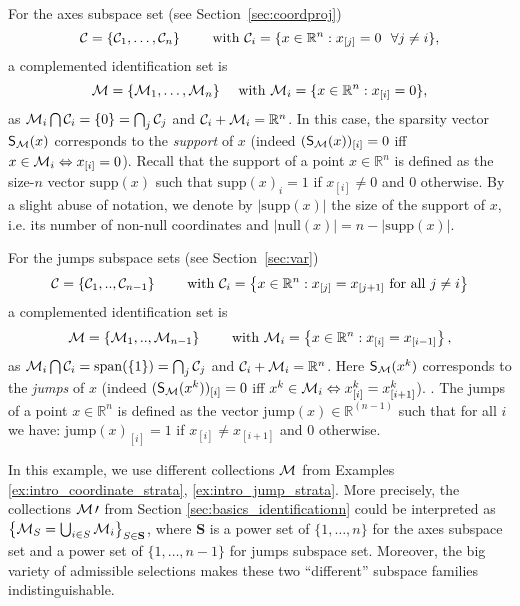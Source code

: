 \begin{example}\label{ex:supp}
For the axes subspace set (see Section~\ref{sec:coordproj})
\begin{equation}\label{eq:Ccoord}
    \mathcal{C} = \{\mathcal{C}_1,\ldots,\mathcal{C}_n\} \qquad\text{ with } \mathcal{C}_i = \{x\in\mathbb{R}^n  : x_{[j]} = 0 ~~ \forall j \neq i \},
\end{equation}
a {complemented} identification set is 
\begin{equation}\label{eq:Mcoord}
    \mathcal{M} = \{\mathcal{M}_1,\ldots,\mathcal{M}_n\} \quad\text{ with } \mathcal{M}_i = \{x\in\mathbb{R}^n  : x_{[i]} = 0 \}, 
\end{equation} 
as $\mathcal{M}_i \bigcap \mathcal{C}_i = \{0\} = \bigcap_j \mathcal{C}_j$ and $\mathcal{C}_i+\mathcal{M}_i = \mathbb{R}^n$. 
{In this case, the sparsity vector $\mathsf{S}_{\mathcal{M}}(x)$ corresponds to the \emph{support} of $x$ (indeed $(\mathsf{S}_{\mathcal{M}}(x))_{[i]} = 0$ iff $x \in \mathcal{M}_i \Leftrightarrow x_{[i]}=0$). Recall that the support of a point $x\in\mathbb{R}^n$ is defined as the size-$n$ vector $\mathrm{supp}(x)$ such that $\mathrm{supp}(x)_i = 1$ if $x_{[i]}\neq 0$ and $0$ otherwise. By a slight abuse of notation, we denote by $|\mathrm{supp}(x)|$ the size of the support of $x$, i.e. its number of non-null coordinates and $|\mathrm{null}(x)| = n - |\mathrm{supp}(x)|$.}

For the jumps subspace sets (see Section~\ref{sec:var})
\begin{equation}\label{eq:Cjump}
    \mathcal{C} = \{\mathcal{C}_1,..,\mathcal{C}_{n-1}\} \qquad\text{ with } \mathcal{C}_i = \left\{x\in\mathbb{R}^n  : 
x_{[j]} = x_{[j+1]} \text{ for all $j\neq i$} \right\}
\end{equation}  
a  {complemented} identification set is 
\begin{equation}\label{eq:Mjump}
\mathcal{M} = \{\mathcal{M}_1,..,\mathcal{M}_{n-1} \} \qquad\text{ with } \mathcal{M}_i = \left\{x\in\mathbb{R}^n  :  x_{[i]} = x_{[i-1]} \right\},    
\end{equation}
as $\mathcal{M}_i \bigcap \mathcal{C}_i = \mathrm{span}(\{1\}) = \bigcap_j \mathcal{C}_j$ and $\mathcal{C}_i+\mathcal{M}_i = \mathbb{R}^n$. {Here $\mathsf{S}_{\mathcal{M}}(x^{k})$ corresponds to the \emph{jumps} of $x$ (indeed $(\mathsf{S}_{\mathcal{M}}(x^k))_{[i]} = 0$ iff $x^k \in \mathcal{M}_i \Leftrightarrow x_{[i]}^k=x_{[i+1]}^k$). . The jumps of a point $x\in\mathbb{R}^n$ is defined as the vector $\mathrm{jump}(x)\in \mathbb{R}^{(n-1)}$ such that for all $i$ we have: $\mathrm{jump}(x)_{[i]} = 1$ if $x_{[i]}\neq x_{[i+1]}$ and $0$ otherwise.}
\end{example}
{\color{blue} In this example, we use different collections $\mathcal{M}$ from Examples \ref{ex:intro_coordinate_strata}, \ref{ex:intro_jump_strata}. More precisely, the collections $\mathcal{M}\prime$ from Section \ref{sec:basics_identificationn} could be interpreted as $\left\{\mathcal{M}_{S} = \bigcup_{i\in S}\mathcal{M}_i\right\}_{S\in\mathbf{S}}$, where $\mathbf{S}$ is a power set of $\{1,\ldots, n\}$ for the axes subspace set and a power set of $\{1,\ldots, n-1\}$ for jumps subspace set. Moreover, the big variety of admissible selections makes these two ``different'' subspace families indistinguishable.}
\smallskip

